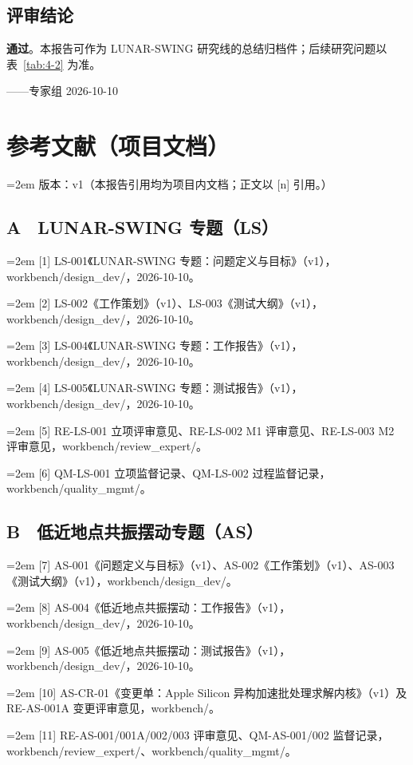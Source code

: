 \documentclass[UTF8,fontset=none]{ctexbook}
\begin{document}
\section{评审结论}
\textbf{通过}。本报告可作为 LUNAR-SWING 研究线的总结归档件；后续研究问题以表~\ref{tab:4-2} 为准。\par
——专家组 2026-10-10\par
\clearpage{}
\chapter*{参考文献（项目文档）}
\noindent\hangindent=2em 版本：v1（本报告引用均为项目内文档；正文以 [n] 引用。）\par
\section*{A　LUNAR-SWING 专题（LS）}
\noindent\hangindent=2em [1] LS-001《LUNAR-SWING 专题：问题定义与目标》（v1），workbench/design\_dev/，2026-10-10。\par
\noindent\hangindent=2em [2] LS-002《工作策划》（v1）、LS-003《测试大纲》（v1），workbench/design\_dev/，2026-10-10。\par
\noindent\hangindent=2em [3] LS-004《LUNAR-SWING 专题：工作报告》（v1），workbench/design\_dev/，2026-10-10。\par
\noindent\hangindent=2em [4] LS-005《LUNAR-SWING 专题：测试报告》（v1），workbench/design\_dev/，2026-10-10。\par
\noindent\hangindent=2em [5] RE-LS-001 立项评审意见、RE-LS-002 M1 评审意见、RE-LS-003 M2 评审意见，workbench/review\_expert/。\par
\noindent\hangindent=2em [6] QM-LS-001 立项监督记录、QM-LS-002 过程监督记录，workbench/quality\_mgmt/。\par
\section*{B　低近地点共振摆动专题（AS）}
\noindent\hangindent=2em [7] AS-001《问题定义与目标》（v1）、AS-002《工作策划》（v1）、AS-003《测试大纲》（v1），workbench/design\_dev/。\par
\noindent\hangindent=2em [8] AS-004《低近地点共振摆动：工作报告》（v1），workbench/design\_dev/，2026-10-10。\par
\noindent\hangindent=2em [9] AS-005《低近地点共振摆动：测试报告》（v1），workbench/design\_dev/，2026-10-10。\par
\noindent\hangindent=2em [10] AS-CR-01《变更单：Apple Silicon 异构加速批处理求解内核》（v1）及 RE-AS-001A 变更评审意见，workbench/。\par
\noindent\hangindent=2em [11] RE-AS-001/001A/002/003 评审意见、QM-AS-001/002 监督记录，workbench/review\_expert/、workbench/quality\_mgmt/。\par
\end{document}
